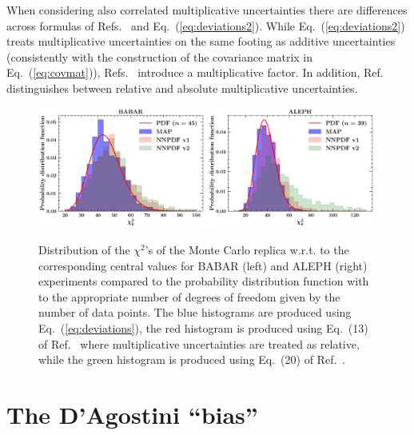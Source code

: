 \documentclass[10pt,a4paper]{article}
\begin{document}
When considering also correlated multiplicative uncertainties there
are differences across formulas of Refs.~\cite{Ball:2008by,
  Ball:2014uwa} and Eq.~(\ref{eq:deviations2}). While
Eq.~(\ref{eq:deviations2}) treats multiplicative uncertainties on the
same footing as additive uncertainties (consistently with the
construction of the covariance matrix in Eq.~(\ref{eq:covmat})),
Refs.~\cite{Ball:2008by, Ball:2014uwa} introduce a multiplicative
factor. In addition, Ref.~\cite{Ball:2008by} distinguishes between
relative and absolute multiplicative uncertainties.
\begin{figure}[h]
  \begin{centering}
    \includegraphics[width=0.49\textwidth]{plots/Chi2DistBABAR}
    \includegraphics[width=0.49\textwidth]{plots/Chi2DistALEPH}
    \caption{Distribution of the $\chi^2$'s of the Monte Carlo replica
      w.r.t. to the corresponding central values for BABAR (left) and
      ALEPH (right) experiments compared to the probability
      distribution function with to the appropriate number of degrees
      of freedom given by the number of data points. The blue
      histograms are produced using Eq.~(\ref{eq:deviations}), the red
      histogram is produced using Eq.~(13) of Ref.~\cite{Ball:2008by}
      where multiplicative uncertainties are treated as relative,
      while the green histogram is produced using Eq.~(20) of
      Ref.~\cite{Ball:2014uwa}. \label{fig:Chi2Dist}}
  \end{centering}
\end{figure}

\section{The D'Agostini ``bias''}
\end{document}
